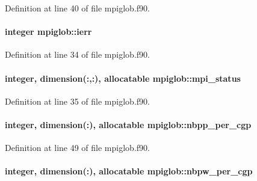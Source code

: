 Definition at line 40 of file mpiglob.\-f90.

\hypertarget{classmpiglob_a2812a8f03176fc85c7f84fc69d9e85a4}{
\paragraph[{ierr}]{\setlength{\rightskip}{0pt plus 5cm}integer mpiglob\-::ierr}}\label{classmpiglob_a2812a8f03176fc85c7f84fc69d9e85a4}


Definition at line 34 of file mpiglob.\-f90.

\hypertarget{classmpiglob_ae890fb0efe3f1ae2f40c1b905fea0f5d}{
\paragraph[{mpi\-\_\-status}]{\setlength{\rightskip}{0pt plus 5cm}integer, dimension(\-:,\-:), allocatable mpiglob\-::mpi\-\_\-status}}\label{classmpiglob_ae890fb0efe3f1ae2f40c1b905fea0f5d}


Definition at line 35 of file mpiglob.\-f90.

\hypertarget{classmpiglob_aa959279cfbe1fe37e3258d939c68f439}{
\paragraph[{nbpp\-\_\-per\-\_\-cgp}]{\setlength{\rightskip}{0pt plus 5cm}integer, dimension(\-:), allocatable mpiglob\-::nbpp\-\_\-per\-\_\-cgp}}\label{classmpiglob_aa959279cfbe1fe37e3258d939c68f439}


Definition at line 49 of file mpiglob.\-f90.

\hypertarget{classmpiglob_ac58b58e3db74a75b6e86f6283cb7d88f}{
\paragraph[{nbpw\-\_\-per\-\_\-cgp}]{\setlength{\rightskip}{0pt plus 5cm}integer, dimension(\-:), allocatable mpiglob\-::nbpw\-\_\-per\-\_\-cgp}}\label{classmpiglob_ac58b58e3db74a75b6e86f6283cb7d88f}



